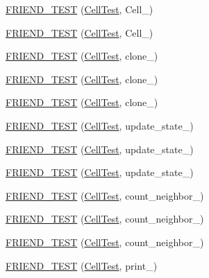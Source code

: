 \begin{DoxyCompactItemize}
\item 
\hyperlink{classCell_ac7a28dab71b04608f6ba9bc9e4dd22b5}{F\-R\-I\-E\-N\-D\-\_\-\-T\-E\-S\-T} (\hyperlink{classCell_a4a8fb13b6ff304aefc7aa29538062941}{Cell\-Test}, Cell\-\_)
\item 
\hyperlink{classCell_a9583f761975928f9a3e8b07174fb40ef}{F\-R\-I\-E\-N\-D\-\_\-\-T\-E\-S\-T} (\hyperlink{classCell_a4a8fb13b6ff304aefc7aa29538062941}{Cell\-Test}, Cell\-\_)
\item 
\hyperlink{classCell_ab60670aa7385b6cf5ae13f8a26743b8d}{F\-R\-I\-E\-N\-D\-\_\-\-T\-E\-S\-T} (\hyperlink{classCell_a4a8fb13b6ff304aefc7aa29538062941}{Cell\-Test}, clone\-\_)
\item 
\hyperlink{classCell_a019c5da45cec2255da2c4ab0d7805ec5}{F\-R\-I\-E\-N\-D\-\_\-\-T\-E\-S\-T} (\hyperlink{classCell_a4a8fb13b6ff304aefc7aa29538062941}{Cell\-Test}, clone\-\_)
\item 
\hyperlink{classCell_a502208a79c44f6601e157a1dcdcac4d1}{F\-R\-I\-E\-N\-D\-\_\-\-T\-E\-S\-T} (\hyperlink{classCell_a4a8fb13b6ff304aefc7aa29538062941}{Cell\-Test}, clone\-\_)
\item 
\hyperlink{classCell_aa5ea305159c8c7b067286cda4e828218}{F\-R\-I\-E\-N\-D\-\_\-\-T\-E\-S\-T} (\hyperlink{classCell_a4a8fb13b6ff304aefc7aa29538062941}{Cell\-Test}, update\-\_\-state\-\_)
\item 
\hyperlink{classCell_a8928f24da1d3b7ab13be5f027636c495}{F\-R\-I\-E\-N\-D\-\_\-\-T\-E\-S\-T} (\hyperlink{classCell_a4a8fb13b6ff304aefc7aa29538062941}{Cell\-Test}, update\-\_\-state\-\_)
\item 
\hyperlink{classCell_a35d41917a03645cf9d75edde241d6752}{F\-R\-I\-E\-N\-D\-\_\-\-T\-E\-S\-T} (\hyperlink{classCell_a4a8fb13b6ff304aefc7aa29538062941}{Cell\-Test}, update\-\_\-state\-\_)
\item 
\hyperlink{classCell_a4e6cadd65d76a1a4223e1ce2f5a0a32b}{F\-R\-I\-E\-N\-D\-\_\-\-T\-E\-S\-T} (\hyperlink{classCell_a4a8fb13b6ff304aefc7aa29538062941}{Cell\-Test}, count\-\_\-neighbor\-\_)
\item 
\hyperlink{classCell_ab813fa2df3240553c36e5ed8a2fb7c57}{F\-R\-I\-E\-N\-D\-\_\-\-T\-E\-S\-T} (\hyperlink{classCell_a4a8fb13b6ff304aefc7aa29538062941}{Cell\-Test}, count\-\_\-neighbor\-\_)
\item 
\hyperlink{classCell_a865fe812b0dfd098462752fb1a561b44}{F\-R\-I\-E\-N\-D\-\_\-\-T\-E\-S\-T} (\hyperlink{classCell_a4a8fb13b6ff304aefc7aa29538062941}{Cell\-Test}, count\-\_\-neighbor\-\_)
\item 
\hyperlink{classCell_adff24a73ddfdcb0fb212706ed1f0b0ab}{F\-R\-I\-E\-N\-D\-\_\-\-T\-E\-S\-T} (\hyperlink{classCell_a4a8fb13b6ff304aefc7aa29538062941}{Cell\-Test}, print\-\_)

\end{DoxyCompactItemize}
